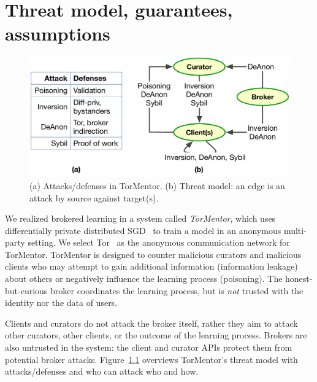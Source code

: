 \chapter{Threat model, guarantees, assumptions}
\label{sec:threat}

\begin{figure}[t]
  \centering
  \includegraphics[width=.9\linewidth]{fig/who-attacks-who}
  \caption{(a) Attacks/defenses in TorMentor. (b) Threat model: an
    edge is an attack by source against target(s).}
  \label{fig:threatmodel}
\end{figure}


We realized brokered learning in a system called \emph{TorMentor},
which uses differentially private distributed SGD~\cite{Song:2013} to
train a model in an anonymous multi-party setting. We select 
Tor~\cite{Dingledine:2004} as the anonymous communication network for
TorMentor. TorMentor is designed to counter malicious curators and
malicious clients who may attempt to gain additional information 
(information leakage) about others or negatively influence the
learning process (poisoning). The honest-but-curious broker coordinates
the learning process, but is \emph{not} trusted with the identity nor
the data of users.

Clients and curators do not attack the broker itself, rather they aim
to attack other curators, other clients, or the outcome of the learning
process. Brokers are also untrusted in the system: the client and
curator APIs protect them from potential broker attacks. 
Figure~\ref{fig:threatmodel} overviews TorMentor's threat model with
attacks/defenses and who can attack who and how.

